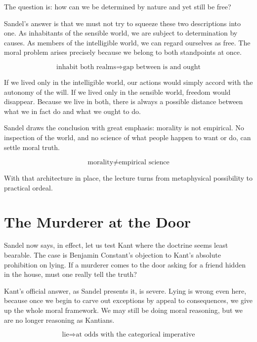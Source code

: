 The question is: how can we be determined by nature and yet still be free?

Sandel's answer is that we must not try to squeeze these two descriptions into one. As inhabitants of the sensible world, we are subject to determination by causes. As members of the intelligible world, we can regard ourselves as free. The moral problem arises precisely because we belong to both standpoints at once.

\begin{equation}
\text{inhabit both realms} \Longrightarrow \text{gap between is and ought}
\end{equation}

If we lived only in the intelligible world, our actions would simply accord with the autonomy of the will. If we lived only in the sensible world, freedom would disappear. Because we live in both, there is always a possible distance between what we in fact do and what we ought to do.

Sandel draws the conclusion with great emphasis: morality is not empirical. No inspection of the world, and no science of what people happen to want or do, can settle moral truth.

\begin{equation}
\text{morality} \neq \text{empirical science}
\end{equation}

With that architecture in place, the lecture turns from metaphysical possibility to practical ordeal.

\section{The Murderer at the Door}

Sandel now says, in effect, let us test Kant where the doctrine seems least bearable. The case is Benjamin Constant's objection to Kant's absolute prohibition on lying. If a murderer comes to the door asking for a friend hidden in the house, must one really tell the truth?

Kant's official answer, as Sandel presents it, is severe. Lying is wrong even here, because once we begin to carve out exceptions by appeal to consequences, we give up the whole moral framework. We may still be doing moral reasoning, but we are no longer reasoning as Kantians.

\begin{equation}
\text{lie} \Longrightarrow \text{at odds with the categorical imperative}
\end{equation}


